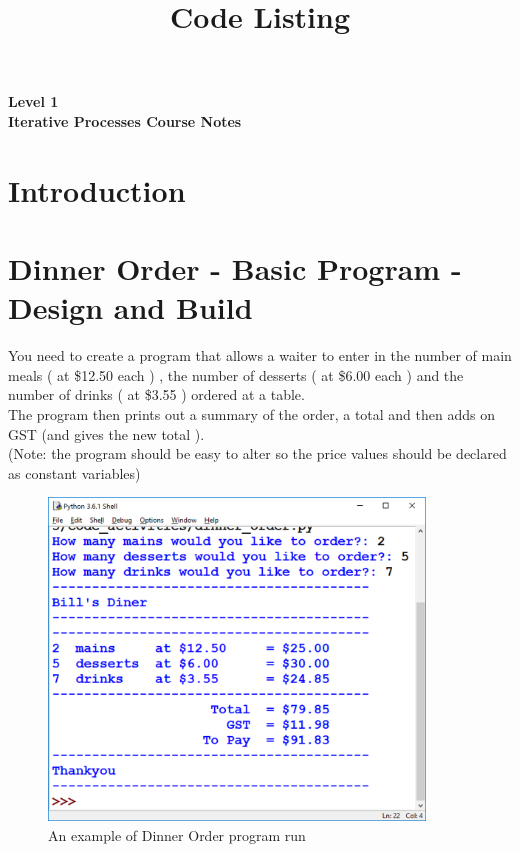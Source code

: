 \documentclass[a4paper,12pt]{article}
\title{Code Listing}
\date{ }
\begin{document}
	\Large
	\textbf{Level 1 }\\
	\textbf{Iterative Processes Course Notes }
	\normalsize
	\tableofcontents
\newpage
\section{Introduction}


\newpage



\newpage
\section{Dinner Order - Basic Program - Design and Build}
You need to create a program that allows a waiter to enter in the number of main meals ( at \$12.50 each ) , the number of desserts ( at \$6.00 each ) and the number of drinks ( at \$3.55 ) ordered at a table.\\
The program then prints out a summary of the order, a total and then adds on GST (and gives the new total ).\\
(Note: the program should be easy to alter so the price values should be declared as constant variables)


\begin{figure} [!h]
	\centering
	\includegraphics[width=10cm]{screen_shots/diner.png}
	\caption*{An example of Dinner Order program run}
\end{figure}
\end{document}
